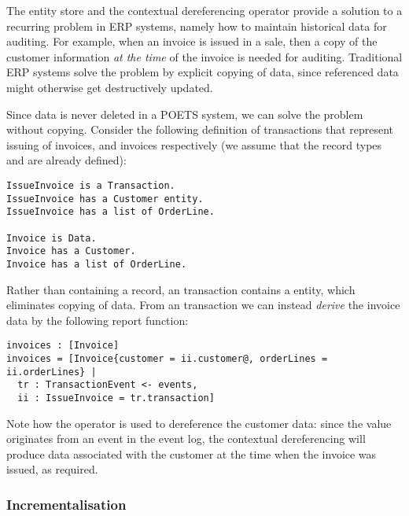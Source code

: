\begin{example}
  The entity store and the contextual dereferencing operator provide
  a solution to a recurring problem in ERP systems, namely how to
  maintain historical data for auditing. For example, when an invoice
  is issued in a sale, then a copy of the customer information
  \emph{at the time} of the invoice is needed for
  auditing. Traditional ERP systems solve the problem by explicit
  copying of data, since referenced data might otherwise get
  destructively updated.
  
  Since data is never deleted in a POETS system, we can solve
  the problem without copying. Consider the following definition of
  transactions that represent issuing of invoices, and invoices
  respectively (we assume that the record types 
  and  are already defined):
\begin{lstlisting}[language=ontology,basicstyle=\small,multicols=2]
IssueInvoice is a Transaction.
IssueInvoice has a Customer entity.
IssueInvoice has a list of OrderLine.

Invoice is Data.
Invoice has a Customer.
Invoice has a list of OrderLine.
\end{lstlisting}
  \vspace{-12pt} Rather than containing a 
  record, an  transaction contains a
   entity, which eliminates copying of data.
  From an  transaction we can instead
  \emph{derive} the invoice data by the following report function:
\begin{lstlisting}[language=parrot,basicstyle=\normalsize]
invoices : [Invoice]
invoices = [Invoice{customer = ii.customer@, orderLines = ii.orderLines} |
  tr : TransactionEvent <- events,
  ii : IssueInvoice = tr.transaction]
\end{lstlisting}
  Note how the  operator is used to dereference the customer
  data: since the  value originates from an event in
  the event log, the contextual dereferencing will produce data
  associated with the customer at the time when the invoice was
  issued, as required.
\end{example}

\subsubsection{Incrementalisation}
\label{sec:incrementalisation}


